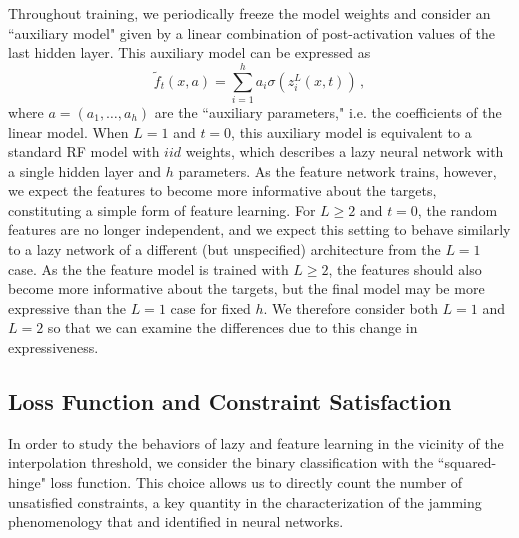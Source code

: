 \documentclass[11pt]{article}
\begin{document}
Throughout training, we periodically freeze the model weights and consider an ``auxiliary model" given by a linear combination of post-activation values of the last hidden layer. This auxiliary model can be expressed as
\begin{equation}
    \tilde f_t(x, a) = \sum_{i=1}^h a_i \sigma(z^L_i(x, t))\,,
    \label{auxiliary}
\end{equation}
where $a = (a_1, \ldots, a_h)$ are the ``auxiliary parameters," i.e. the coefficients of the linear model. When $L=1$ and $t=0$, this auxiliary model is equivalent to a standard RF model with $iid$ weights, which describes a lazy neural network with a single hidden layer and $h$ parameters. As the feature network trains, however, we expect the features to become more informative about the targets, constituting a simple form of feature learning. For $L\geq2$ and $t=0$, the random features are no longer independent, and we expect this setting to behave similarly to a lazy network of a different (but unspecified) architecture from the $L=1$ case. As the the feature model is trained with $L\geq2$, the features should also become more informative about the targets, but the final model may be more expressive than the $L=1$ case for fixed $h$. We therefore consider both $L=1$ and $L=2$ so that we can examine the differences due to this change in expressiveness.

\subsection{Loss Function and Constraint Satisfaction}

In order to study the behaviors of lazy and feature learning in the vicinity of the interpolation threshold, we consider the binary classification with the ``squared-hinge" loss function. This choice allows us to directly count the number of unsatisfied constraints, a key quantity in the characterization of the jamming phenomenology that \cite{geigerJammingTransitionParadigm2019} and \cite{spiglerJammingTransitionOverparametrization2019} identified in neural networks.\\
\end{document}
